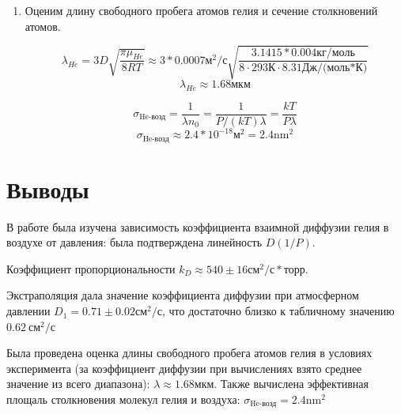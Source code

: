 \documentclass[a4paper,12pt]{article}
\begin{document}
\begin{enumerate}
\item Оценим длину свободного пробега атомов гелия и сечение столкновений атомов. \newline

\begin{equation}
    \lambda_{He} = 3D\sqrt{\frac{\pi \mu_{He}}{8RT}} \approx 3*0.0007\text{м} ^2/\text{с}\sqrt{\frac{3.1415*0.004\text{кг/моль}}{8\cdot293К\cdot8.31\text{Дж/(моль*К)}}}
\end{equation}
\begin{equation}
    \lambda_{He} \approx 1.68 \text{мкм}
\end{equation}

\begin{equation}
    \sigma_{\text{He-возд}} = \frac{1}{\lambda n_0} = \frac{1}{P/(kT)\lambda} =\frac{kT}{P\lambda}
\end{equation}
\begin{equation}
    \sigma_{\text{He-возд}} \approx 2.4 *10^{-18}\text{м}^2 = 2.4 \text{nm}^2
\end{equation}
\end{enumerate}

\section{Выводы}
\par В работе была изучена зависимость коэффициента взаимной диффузии гелия в воздухе от давления: была подтверждена линейность $D(1/P)$. \newline

Коэффициент пропорциональности $k_D \approx 540 \pm 16 \text{см} ^2/\text{с}*\text{торр}$.\newline
\par Экстраполяция дала значение коэффициента диффузии при атмосферном давлении $D_1 = 0.71 \pm 0.02 \text{см} ^2/\text{с} $, что достаточно близко к табличному значению $0.62 \ \text{см} ^2/\text{с} $

\par Была проведена оценка длины свободного пробега атомов гелия в условиях эксперимента (за коэффициент диффузии при вычислениях взято среднее значение из всего диапазона): $\lambda \approx 1.68 \text{мкм}$.
Также вычислена эффективная площаль столкновения молекул гелия и воздуха: $\sigma_{\text{He-возд}} = 2.4 \text{nm}^2$
\end{document}
